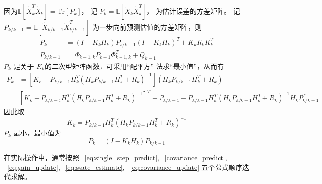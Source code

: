 \documentclass{ctexart}
\numberwithin{equation}{section}
\def\E{\mathbb{E}}
\def\Tr{\mathrm{Tr}}
\begin{document}
因为$\E[\widetilde{X}_k^T \widetilde{X}_k]  = \Tr[P_k]$，
记 $P_k = \E[\widetilde{X}_k \widetilde{X}_k^T] $， 为估计误差的方差矩阵。
记 $P_{k/k-1} = \E[\widetilde{X}_{k/k-1}\widetilde{X}_{k/k-1}^T] $ 为一步向前预测估值的方差矩阵，则
\begin{align}
P_k  & = (I- K_k H_k)P_{k/k-1} (I- K_k H_k)^T+K_k R_k K_k^T  \nonumber \\
P_{k/k-1} & = \Phi_{k-1, k} P_{k-1} \Phi_{k-1, k}^T + Q_{k-1} \label{covariance_predict}
\end{align}
$P_k$ 是关于 $K_k$的二次型矩阵函数，可采用“配平方” 法求“最小值”，从而有
\begin{align*}
P_k & = [K_k - P_{k/k-1} H_k^T (H_k P_{k/k-1} H_k^T + R_k)^{-1} ] (H_k P_{k/k-1} H_k^T + R_k) \\
&[K_k - P_{k/k-1} H_k^T (H_k P_{k/k-1} H_k^T + R_k)^{-1} ]^T + P_{k/k-1} - P_{k/k-1} H_k^T(H_k P_{k/k-1} H_k^T + R_k)^{-1}
H_k P_{k/k-1}^T
\end{align*}
因此取
\begin{equation}\label{eq:gain_update}
 K_k = P_{k/k-1} H_k^T(H_k P_{k/k-1} H_k^T + R_k)^{-1}
 \end{equation}
 $P_k$ 最小，最小值为
\begin{equation}\label{eq:covariance_update}
P_k = (I - K_k H_k)P_{k/k-1}
\end{equation}

在实际操作中，通常按照 ~\eqref{eq:single_step_predict}, ~\eqref{covariance_predict}, ~\eqref{eq:gain_update},
~\eqref{eq:state_estimate},
~\eqref{eq:covariance_update}
五个公式顺序迭代求解。
\end{document}
